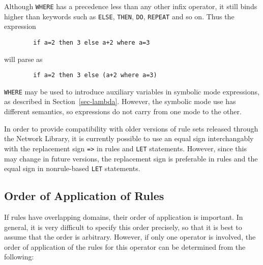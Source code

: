 Although {\tt WHERE} has a precedence less than any other infix operator,
it still binds higher than keywords such as {\tt ELSE}, {\tt THEN},
{\tt DO}, {\tt REPEAT} and so on.  Thus the expression
\begin{verbatim}
        if a=2 then 3 else a+2 where a=3
\end{verbatim}
will parse as
\begin{verbatim}
        if a=2 then 3 else (a+2 where a=3)
\end{verbatim}

{\tt WHERE} may be used to introduce auxiliary variables in symbolic mode
expressions, as described in Section~\ref{sec-lambda}.  However, the
symbolic mode use has different semantics, so expressions do not carry
from one mode to the other.

\COMPATNOTE In order to provide compatibility with older versions of rule
sets released through the Network Library, it is currently possible to use
an equal sign interchangably with the replacement sign {\tt =>} in rules
and {\tt LET} statements.  However, since this may change in future
versions, the replacement sign is preferable in rules and the equal sign
in nonrule-based {\tt LET} statements.

\subsection*{Order of Application of Rules}

If rules have overlapping domains, their order of application is
important.  In general, it is very difficult to specify this order
precisely, so that it is best to assume that the order is arbitrary.
However, if only one operator is involved, the order of application of the
rules for this operator can be determined from the following:

